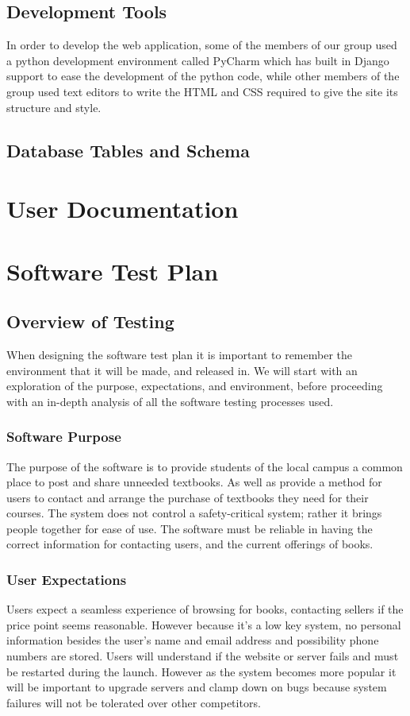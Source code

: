 \documentclass[11pt]{article}
\begin{document}
\subsection{Development Tools}
\label{sec-development-tools}

In order to develop the web application, some of the members of our
group used a python development environment called PyCharm which has
built in Django support to ease the development of the python
code, while other members of the group used text editors to write the
HTML and CSS required to give the site its structure and style.


\subsection{Database Tables and Schema}
\label{sec-database-schema}

\section{User Documentation}
\label{sec-user-docs}

\section{Software Test Plan}
\label{sec-software-test-plan}
	\subsection{Overview of Testing}
		When designing the software test plan it is important to remember the environment that it will be made, and released in.
		We will start with an exploration of the purpose, expectations, and environment, before proceeding with an in-depth analysis of all the software testing processes used.
		\subsubsection{Software Purpose}
			The purpose of the software is to provide students of the local campus a common place to post and share unneeded textbooks.
			As well as provide a method for users to contact and arrange the purchase of textbooks they need for their courses. 
			The system does not control a safety-critical system; rather it brings people together for ease of use. 
			The software must be reliable in having the correct information for contacting users, and the current offerings of books.
		\subsubsection{User Expectations}
			Users expect a seamless experience of browsing for books, contacting sellers if the price point seems reasonable.
			However because it's a low key system, no personal information besides the user's name and email address and possibility phone numbers are stored.
			Users will understand if the website or server fails and must be restarted during the launch.
			However as the system becomes more popular it will be important to upgrade servers and clamp down on bugs because system failures will not be tolerated over other competitors.
\end{document}
